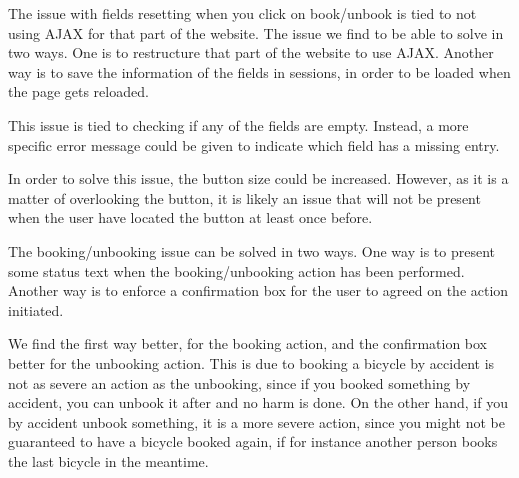 \begin{description}[style=nextline]
	\item[{\#}1 Fields reset]
	The issue with fields resetting when you click on book/unbook is tied to not using AJAX for that part of the website.
	The issue we find to be able to solve in two ways.
	One is to restructure that part of the website to use AJAX.
	Another way is to save the information of the fields in sessions, in order to be loaded when the page gets reloaded. 
	\item[{\#}2 Error message understandability]
	This issue is tied to checking if any of the fields are empty.
	Instead, a more specific error message could be given to indicate which field has a missing entry.
	\item[{\#}3 Difficulty finding history]
	In order to solve this issue, the button size could be increased.
	However, as it is a matter of overlooking the button, it is likely an issue that will not be present when the user have located the button at least once before.
	\item[{\#}4 Booking/Unbooking confirmation]
	The booking/unbooking issue can be solved in two ways.
	One way is to present some status text when the booking/unbooking action has been performed.
	Another way is to enforce a confirmation box for the user to agreed on the action initiated.
	
	We find the first way better, for the booking action, and the confirmation box better for the unbooking action.
	This is due to booking a bicycle by accident is not as severe an action as the unbooking, since if you booked something by accident, you can unbook it after and no harm is done.
	On the other hand, if you by accident unbook something, it is a more severe action, since you might not be guaranteed to have a bicycle booked again, if for instance another person books the last bicycle in the meantime.
\end{description}